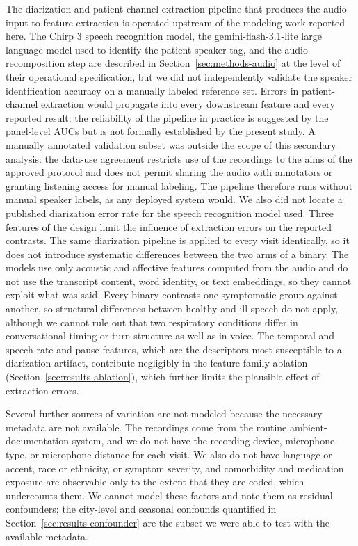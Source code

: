 \documentclass[utf8]{FrontiersinHarvard} %
\begin{document}
The diarization and patient-channel extraction pipeline that produces the audio input to feature extraction is operated upstream of the modeling work reported here. The Chirp 3 speech recognition model, the gemini-flash-3.1-lite large language model used to identify the patient speaker tag, and the audio recomposition step are described in Section~\ref{sec:methods-audio} at the level of their operational specification, but we did not independently validate the speaker identification accuracy on a manually labeled reference set. Errors in patient-channel extraction would propagate into every downstream feature and every reported result; the reliability of the pipeline in practice is suggested by the panel-level AUCs but is not formally established by the present study. A manually annotated validation subset was outside the scope of this secondary analysis: the data-use agreement restricts use of the recordings to the aims of the approved protocol and does not permit sharing the audio with annotators or granting listening access for manual labeling. The pipeline therefore runs without manual speaker labels, as any deployed system would. We also did not locate a published diarization error rate for the speech recognition model used. Three features of the design limit the influence of extraction errors on the reported contrasts. The same diarization pipeline is applied to every visit identically, so it does not introduce systematic differences between the two arms of a binary. The models use only acoustic and affective features computed from the audio and do not use the transcript content, word identity, or text embeddings, so they cannot exploit what was said. Every binary contrasts one symptomatic group against another, so structural differences between healthy and ill speech do not apply, although we cannot rule out that two respiratory conditions differ in conversational timing or turn structure as well as in voice. The temporal and speech-rate and pause features, which are the descriptors most susceptible to a diarization artifact, contribute negligibly in the feature-family ablation (Section~\ref{sec:results-ablation}), which further limits the plausible effect of extraction errors.

Several further sources of variation are not modeled because the necessary metadata are not available. The recordings come from the routine ambient-documentation system, and we do not have the recording device, microphone type, or microphone distance for each visit. We also do not have language or accent, race or ethnicity, or symptom severity, and comorbidity and medication exposure are observable only to the extent that they are coded, which undercounts them. We cannot model these factors and note them as residual confounders; the city-level and seasonal confounds quantified in Section~\ref{sec:results-confounder} are the subset we were able to test with the available metadata.
\end{document}
